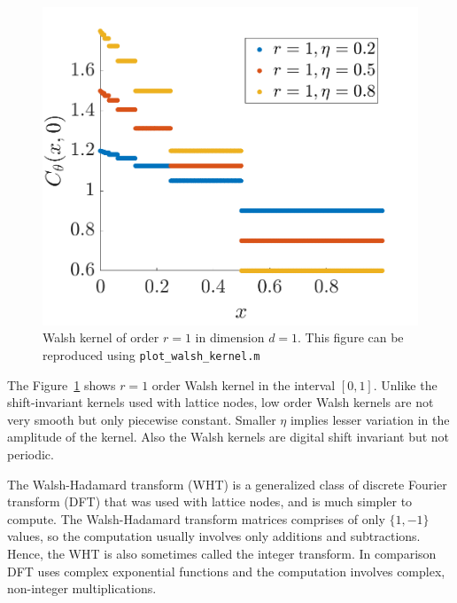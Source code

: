 \documentclass{iitthesis}          %
\newcommand{\code}[1]{\texttt{#1}}
\newcommand\figref{Figure~\ref}
\newcommand{\JRNote}[1]{{\textcolor{green}{JR: #1}}}
\begin{document}
\begin{figure}
	\centering
	\includegraphics[width=0.9\linewidth]{"figures/walsh_kernel dim_1"}
	\caption[Walsh kernel]{Walsh kernel of order $r=1$ in dimension $d=1$. This figure can be reproduced using \code{plot\_walsh\_kernel.m}}
	\label{fig:walshkernel-dim1}
\end{figure}
The \figref{fig:walshkernel-dim1} shows $r=1$ order Walsh kernel in the interval $[0,1]$. Unlike the shift-invariant kernels used with lattice nodes, low order Walsh kernels are not very smooth but only piecewise constant. Smaller $\eta$ implies lesser variation in the amplitude of the kernel. Also the Walsh kernels are digital shift invariant but not periodic.

The Walsh-Hadamard transform (WHT) is a generalized class of discrete Fourier transform (DFT) that was used with lattice nodes, and is much simpler to compute. The Walsh-Hadamard transform matrices comprises of only $\{1, -1\}$ values, so the computation usually involves only additions and subtractions. Hence, the WHT is also sometimes called the integer transform. In comparison DFT uses complex exponential functions and the computation involves complex, non-integer multiplications. 
\end{document}
